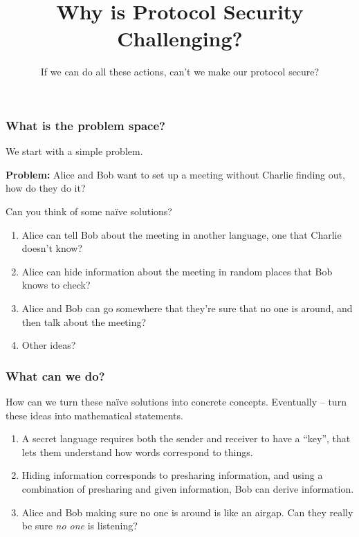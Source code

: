 \documentclass[red]{beamer}
\newcommand{\isred}[1]{{\color{red} {\bf #1}}}
\begin{document}
\begin{frame}\frametitle{What is the problem space?}
\pause
We start with a simple problem.

\pause
\isred{Problem:} Alice and Bob want to set up a meeting without Charlie finding out, how do they do it?

\pause
Can you think of some na\"ive solutions?

\pause
\begin{enumerate}
\item Alice can tell Bob about the meeting in another language, one that Charlie doesn't know?
\pause
\item Alice can hide information about the meeting in random places that Bob knows to check?
\pause
\item Alice and Bob can go somewhere that they're sure that no one is around, and then talk about the meeting?
\pause
\item [] Other ideas?
\end{enumerate}
\end{frame}

\begin{frame}\frametitle{What can we do?}
\pause
How can we turn these na\"ive solutions into concrete concepts.
\pause
Eventually -- turn these ideas into mathematical statements.
\pause
\begin{enumerate}
\item A secret language requires both the sender and receiver to have a ``key'', that lets them understand how words correspond to things.

\pause
\item Hiding information corresponds to presharing information, and using a combination of presharing and given information, Bob can derive information.

\pause
\item Alice and Bob making sure no one is around is like an airgap. Can they really be sure \emph{no one} is listening?

\pause
\end{enumerate}
\end{frame}



\title{Why is Protocol Security Challenging?}
\author{If we can do all these actions, can't we make our protocol secure?}
\date{}
\begin{frame}
\maketitle
\end{frame}
\end{document}
